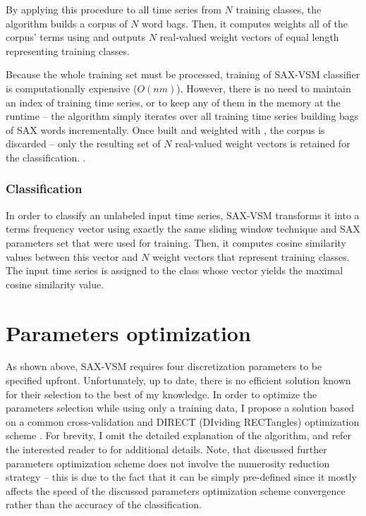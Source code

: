 By applying this procedure to all time series from $N$ training classes, the algorithm builds a corpus of 
$N$ word bags. 
Then, it computes weights all of the corpus' terms using \tfidf and outputs $N$ real-valued weight vectors of 
equal length representing training classes. 

Because the whole training set must be processed, training of SAX-VSM classifier is computationally 
expensive ($O(nm)$). However, there is no need to maintain an index of training time series, or to keep any 
of them in the memory at the runtime -- the algorithm simply iterates over all training time series building 
bags of SAX words incrementally. Once built and weighted with \tfidf, the corpus is discarded -- only the
resulting set of $N$ real-valued weight vectors is retained for the classification.
.
\subsubsection{Classification}
In order to classify an unlabeled input time series, SAX-VSM transforms it into a terms frequency vector using 
exactly the same sliding window technique and SAX parameters set that were used for training. 
Then, it computes cosine similarity values between this vector and $N$ \tfidf weight vectors that represent 
training classes. The input time series is assigned to the class whose vector yields the maximal cosine 
similarity value.

\section{Parameters optimization} \label{section-direct}
As shown above, SAX-VSM requires four discretization parameters to be specified upfront. 
Unfortunately, up to date, there is no efficient solution known for their selection to the best 
of my knowledge. In order to optimize the parameters selection while using only a training data, 
I propose a solution based on a common cross-validation and DIRECT (DIviding RECTangles) 
optimization scheme \cite{citeulike:4210208}. For brevity, I omit the detailed explanation 
of the algorithm, and refer the interested reader to \cite{citeulike:12563460} for additional details.
Note, that discussed further parameters optimization scheme does not involve the numerosity reduction strategy --
this is due to the fact that it can be simply pre-defined since it mostly affects the speed of the discussed 
parameters optimization scheme convergence rather than the accuracy of the classification. 

